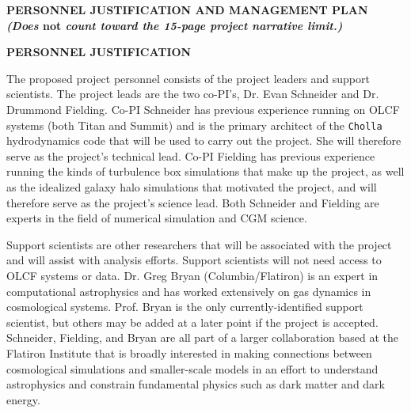 \documentclass[11pt,letterpaper,english]{article}
\begin{document}
\setlength{\parindent}{0in} %


\pagestyle{fancy}   \renewcommand{%
\headrulewidth}{0.0pt}

\begin{center}
\bf {PERSONNEL JUSTIFICATION AND MANAGEMENT PLAN} \\
{\bf  {\em (Does} not {\em count toward the 15-page project narrative limit.)}}
\end{center}

\vspace{-.25in}
\begin{flushleft}
{\noindent \bf  {PERSONNEL JUSTIFICATION}}

The proposed project personnel consists of the project leaders and support scientists. The project leads are the two co-PI's, Dr. Evan Schneider and Dr. Drummond Fielding. Co-PI Schneider has previous experience running on OLCF systems (both Titan and Summit) and is the primary architect of the {\tt Cholla} hydrodynamics code that will be used to carry out the project. She will therefore serve as the project's technical lead. Co-PI Fielding has previous experience running the kinds of turbulence box simulations that make up the project, as well as the idealized galaxy halo simulations that motivated the project, and will therefore serve as the project's science lead. Both Schneider and Fielding are experts in the field of numerical simulation and CGM science. 

Support scientists are other researchers that will be associated with the project and will assist with analysis efforts. Support scientists will not need access to OLCF systems or data.  Dr. Greg Bryan (Columbia/Flatiron) is an expert in computational astrophysics and has worked extensively on gas dynamics in cosmological systems.  Prof. Bryan is the only currently-identified support scientist, but others may be added at a later point if the project is accepted. Schneider, Fielding, and Bryan are all part of a larger collaboration based at the Flatiron Institute that is broadly interested in making connections between cosmological simulations and smaller-scale models in an effort to understand astrophysics and constrain fundamental physics such as dark matter and dark energy.


\end{flushleft}
\end{document}
